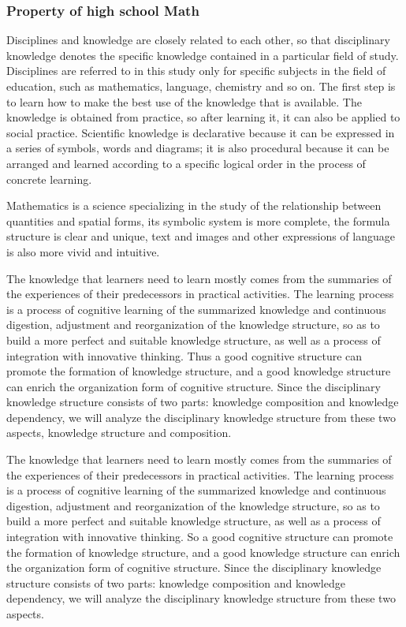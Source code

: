 \documentclass[11pt,en]{elegantpaper}
\begin{document}
\subsubsection{Property of high school Math}
Disciplines and knowledge are closely related to each other, so that disciplinary knowledge denotes the specific knowledge contained in a particular field of study. Disciplines are referred to in this study only for specific subjects in the field of education, such as mathematics, language, chemistry and so on. The first step is to learn how to make the best use of the knowledge that is available. The knowledge is obtained from practice, so after learning it, it can also be applied to social practice. Scientific knowledge is declarative because it can be expressed in a series of symbols, words and diagrams; it is also procedural because it can be arranged and learned according to a specific logical order in the process of concrete learning.

Mathematics is a science specializing in the study of the relationship between quantities and spatial forms, its symbolic system is more complete, the formula structure is clear and unique, text and images and other expressions of language is also more vivid and intuitive.

The knowledge that learners need to learn mostly comes from the summaries of the experiences of their predecessors in practical activities. The learning process is a process of cognitive learning of the summarized knowledge and continuous digestion, adjustment and reorganization of the knowledge structure, so as to build a more perfect and suitable knowledge structure, as well as a process of integration with innovative thinking. Thus a good cognitive structure can promote the formation of knowledge structure, and a good knowledge structure can enrich the organization form of cognitive structure. Since the disciplinary knowledge structure consists of two parts: knowledge composition and knowledge dependency, we will analyze the disciplinary knowledge structure from these two aspects, knowledge structure and composition.

The knowledge that learners need to learn mostly comes from the summaries of the experiences of their predecessors in practical activities. The learning process is a process of cognitive learning of the summarized knowledge and continuous digestion, adjustment and reorganization of the knowledge structure, so as to build a more perfect and suitable knowledge structure, as well as a process of integration with innovative thinking. So a good cognitive structure can promote the formation of knowledge structure, and a good knowledge structure can enrich the organization form of cognitive structure. Since the disciplinary knowledge structure consists of two parts: knowledge composition and knowledge dependency, we will analyze the disciplinary knowledge structure from these two aspects.
\end{document}
